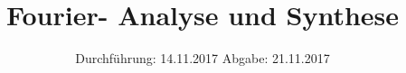 

\subject{Versuch 351}
\title{Fourier- Analyse und Synthese}
\date{%
  Durchführung: 14.11.2017
  \hspace{3em}
  Abgabe: 21.11.2017
}



\maketitle
\thispagestyle{empty}
\tableofcontents
\newpage






\printbibliography{}


